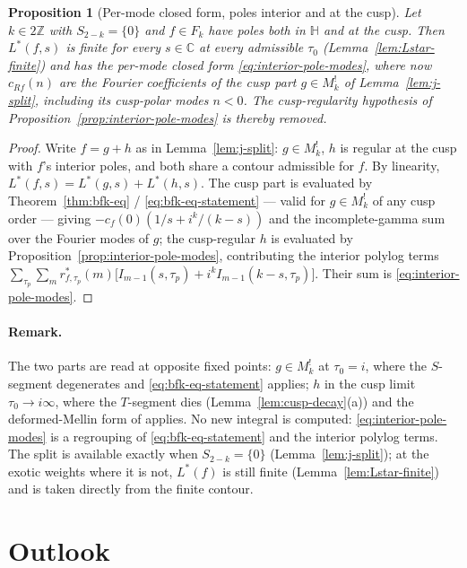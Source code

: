 \documentclass[11pt]{article}
\newtheorem{proposition}[theorem]{Proposition}
\numberwithin{equation}{section}  %
\newcommand{\HH}{\mathbb{H}}
\newcommand{\ZZ}{\mathbb{Z}}
\newcommand{\CC}{\mathbb{C}}
\begin{document}
\begin{proposition}[Per-mode closed form, poles interior and at the cusp]\label{prop:both-poles}
Let $k \in 2\ZZ$ with $S_{2-k} = \{0\}$ and $f \in F_k$ have poles both
in $\HH$ and at the cusp.  Then $L^*(f, s)$ is finite for every $s \in \CC$ at every
admissible $\tau_0$ (Lemma~\ref{lem:Lstar-finite}) and has the per-mode
closed form \eqref{eq:interior-pole-modes}, where now $c_{Rf}(n)$ are
the Fourier coefficients of the cusp part $g \in M^!_k$ of
Lemma~\ref{lem:j-split}, including its cusp-polar modes $n < 0$.  The
cusp-regularity hypothesis of Proposition~\ref{prop:interior-pole-modes}
is thereby removed.
\end{proposition}
\begin{proof}
Write $f = g + h$ as in Lemma~\ref{lem:j-split}: $g \in M^!_k$, $h$ is
regular at the cusp with $f$'s interior poles, and both share a contour
admissible for $f$.  By linearity, $L^*(f, s) = L^*(g, s) + L^*(h, s)$.
The cusp part is evaluated by Theorem~\ref{thm:bfk-eq} /
\eqref{eq:bfk-eq-statement} --- valid for $g \in M^!_k$ of any cusp
order --- giving $-c_f(0)(1/s + i^k/(k-s))$ and the incomplete-gamma
sum over the Fourier modes of $g$; the cusp-regular $h$ is evaluated by
Proposition~\ref{prop:interior-pole-modes}, contributing the interior
polylog terms
$\sum_{\tau_p}\sum_m r^*_{f, \tau_p}(m)\bigl[I_{m-1}(s, \tau_p) + i^k I_{m-1}(k-s, \tau_p)\bigr]$.
Their sum is \eqref{eq:interior-pole-modes}.
\end{proof}

\paragraph{Remark.}
The two parts are read at opposite fixed points: $g \in M^!_k$ at
$\tau_0 = i$, where the $S$-segment degenerates and
\eqref{eq:bfk-eq-statement} applies; $h$ in the cusp limit
$\tau_0 \to i\infty$, where the $T$-segment dies
(Lemma~\ref{lem:cusp-decay}(a)) and the deformed-Mellin form of
\cite{1806} applies.  No new integral is computed:
\eqref{eq:interior-pole-modes} is a regrouping of
\eqref{eq:bfk-eq-statement} and the interior polylog terms.  The split
is available exactly when $S_{2-k} = \{0\}$ (Lemma~\ref{lem:j-split});
at the exotic weights where it is not, $L^*(f)$ is still finite
(Lemma~\ref{lem:Lstar-finite}) and is taken directly from the finite
contour.

\section{Outlook}\label{sec:outlook}
\end{document}
